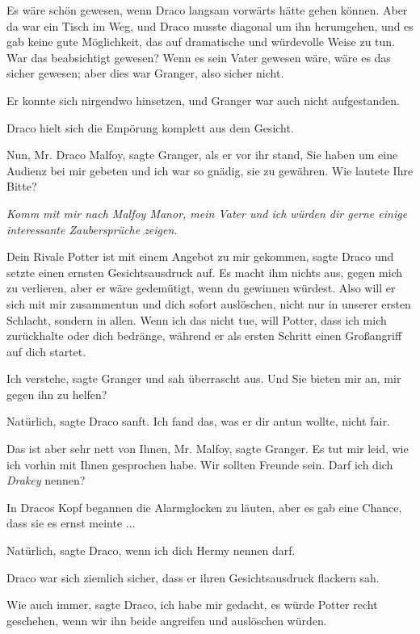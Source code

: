 Es wäre schön gewesen, wenn Draco langsam vorwärts hätte gehen können. Aber da
war ein Tisch im Weg, und Draco musste diagonal um ihn herumgehen, und es gab
keine gute Möglichkeit, das auf dramatische und würdevolle Weise zu tun. War das
beabsichtigt gewesen? Wenn es sein Vater gewesen wäre, wäre es das sicher
gewesen; aber dies war Granger, also sicher nicht.

Er konnte sich nirgendwo hinsetzen, und Granger war auch nicht aufgestanden.

Draco hielt sich die Empörung komplett aus dem Gesicht.

\glqq{}Nun, Mr. Draco Malfoy\grqq{}, sagte Granger, als er vor ihr stand,
\glqq{}Sie haben um eine Audienz bei mir gebeten und ich war so gnädig, sie zu
gewähren. Wie lautete Ihre Bitte?\grqq{}

\emph{Komm mit mir nach Malfoy Manor, mein Vater und ich würden dir gerne einige
interessante Zaubersprüche zeigen.}

\glqq{}Dein Rivale Potter ist mit einem Angebot zu mir gekommen\grqq{}, sagte
Draco und setzte einen ernsten Gesichtsausdruck auf. \glqq{}Es macht ihm nichts
aus, gegen mich zu verlieren, aber er wäre gedemütigt, wenn du gewinnen würdest.
Also will er sich mit mir zusammentun und dich sofort auslöschen, nicht nur in
unserer ersten Schlacht, sondern in allen. Wenn ich das nicht tue, will Potter,
dass ich mich zurückhalte oder dich bedränge, während er als ersten Schritt
einen Großangriff auf dich startet.\grqq{}

\glqq{}Ich verstehe\grqq{}, sagte Granger und sah überrascht aus. \glqq{}Und Sie
bieten mir an, mir gegen ihn zu helfen?\grqq{}

\glqq{}Natürlich\grqq{}, sagte Draco sanft. \glqq{}Ich fand das, was er dir
antun wollte, nicht fair.\grqq{}

\glqq{}Das ist aber sehr nett von Ihnen, Mr. Malfoy\grqq{}, sagte Granger.
\glqq{}Es tut mir leid, wie ich vorhin mit Ihnen gesprochen habe. Wir sollten
Freunde sein. Darf ich dich \emph{Drakey} nennen?\grqq{}

In Dracos Kopf begannen die Alarmglocken zu läuten, aber es gab eine Chance,
dass sie es ernst meinte ...

\glqq{}Natürlich\grqq{}, sagte Draco, \glqq{}wenn ich dich Hermy nennen
darf.\grqq{}

Draco war sich ziemlich sicher, dass er ihren Gesichtsausdruck flackern sah.

\glqq{}Wie auch immer\grqq{}, sagte Draco, \glqq{}ich habe mir gedacht, es würde
Potter recht geschehen, wenn wir ihn beide angreifen und auslöschen
würden.\grqq{}


